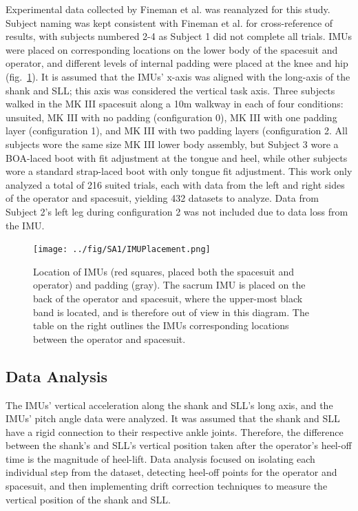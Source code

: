 \documentclass[defaultstyle,11pt]{comps}
\begin{document}
Experimental data collected by Fineman et al.\citep{Fineman2018} was reanalyzed for this study.
Subject naming was kept consistent with Fineman et al.\citep{Fineman2018} for cross-reference of results, with subjects numbered 2-4 as Subject 1 did not complete all trials.
IMUs were placed on corresponding locations on the lower body of the spacesuit and operator, and different levels of internal padding were placed at the knee and hip (fig.~\ref{fig:SA1-Loc}).
It is assumed that the IMUs' x-axis was aligned with the long-axis of the shank and SLL; this axis was considered the vertical task axis.
Three subjects walked in the MK III spacesuit along a 10m walkway in each of four conditions: unsuited, MK III with no padding (configuration 0), MK III with one padding layer (configuration 1), and MK III with two padding layers (configuration 2.
All subjects wore the same size MK III lower body assembly, but Subject 3 wore a BOA-laced boot with fit adjustment at the tongue and heel, while other subjects wore a standard strap-laced boot with only tongue fit adjustment.
This work only analyzed a total of 216 suited trials, each with data from the left and right sides of the operator and spacesuit, yielding 432 datasets to analyze.
Data from Subject 2's left leg during configuration 2 was not included due to data loss from the IMU.

\begin{figure}
\hypertarget{fig:SA1-Loc}{%
\centering
\texttt{[image: ../fig/SA1/IMUPlacement.png]}
\caption{Location of IMUs (red squares, placed both the spacesuit and operator) and padding (gray). The sacrum IMU is placed on the back of the operator and spacesuit, where the upper-most black band is located, and is therefore out of view in this diagram. The table on the right outlines the IMUs corresponding locations between the operator and spacesuit.}\label{fig:SA1-Loc}
}
\end{figure}

\hypertarget{data-analysis}{%
\subsection{Data Analysis}\label{data-analysis}}

The IMUs' vertical acceleration along the shank and SLL's long axis, and the IMUs' pitch angle data were analyzed.
It was assumed that the shank and SLL have a rigid connection to their respective ankle joints.
Therefore, the difference between the shank's and SLL's vertical position taken after the operator's heel-off time is the magnitude of heel-lift.
Data analysis focused on isolating each individual step from the dataset, detecting heel-off points for the operator and spacesuit, and then implementing drift correction techniques to measure the vertical position of the shank and SLL.
\end{document}

